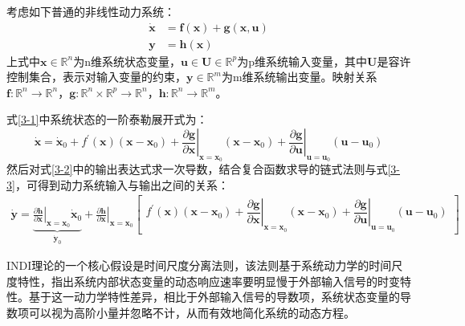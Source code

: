 考虑如下普通的非线性动力系统：
\begin{align}
    \dot{\boldsymbol{x}}&=\boldsymbol{f}(\boldsymbol{x})+\boldsymbol{g}(\boldsymbol{x},\boldsymbol{u}) \label{3-1}
    \\
    \boldsymbol{y}&=\boldsymbol{h}(\boldsymbol{x})\label{3-2}
\end{align}
上式中$\boldsymbol{x}\in\mathbb{R}^{n}$为n维系统状态变量，$\boldsymbol{u}\in\boldsymbol{U}\in\mathbb{R}^{p}$为p维系统输入变量，其中$\boldsymbol{U}$是容许控制集合，表示对输入变量的约束，$\boldsymbol{y}\in\mathbb{R}^{m}$为m维系统输出变量。映射关系$\boldsymbol{f}:\mathbb{R}^n\rightarrow\mathbb{R}^n$，$\boldsymbol{g}:\mathbb{R}^n\times\mathbb{R}^p\rightarrow\mathbb{R}^n$，$\boldsymbol{h}:\mathbb{R}^n\rightarrow\mathbb{R}^m$。

式\eqref{3-1}中系统状态的一阶泰勒展开式为：
\begin{equation}
    \dot{\boldsymbol{x}}=\dot{\boldsymbol{x}}_0+f^{\prime}(\boldsymbol{x})(\boldsymbol{x}-\boldsymbol{x}_0)+\left.\frac{\partial \boldsymbol{g}}{\partial \boldsymbol{x}}\right|_{\boldsymbol{x}=\boldsymbol{x}_0}(\boldsymbol{x}-\boldsymbol{x}_0)+\left.\frac{\partial \boldsymbol{g}}{\partial \boldsymbol{u}}\right|_{\boldsymbol{u}=\boldsymbol{u}_0}(\boldsymbol{u}-\boldsymbol{u}_0)
    \label{3-3}
\end{equation}
然后对式\eqref{3-2}中的输出表达式求一次导数，结合复合函数求导的链式法则与式\eqref{3-3}，可得到动力系统输入与输出之间的关系：
\begin{equation}
    \begin{aligned}
    \dot{\boldsymbol{y}} = \underbrace{\left.\frac{\partial\boldsymbol{h}}{\partial\boldsymbol{x}}\right|_{\boldsymbol{x}=\boldsymbol{x}_0}\dot{\boldsymbol{x}}_0}_{\dot{\boldsymbol{y}}_0} + \left.\frac{\partial \boldsymbol{h}}{\partial \boldsymbol{x}}\right|_{\boldsymbol{x}=\boldsymbol{x}_0}\begin{bmatrix}f^{\prime}(\boldsymbol{x})(\boldsymbol{x}-\boldsymbol{x}_0)+\left.\dfrac{\partial \boldsymbol{g}}{\partial \boldsymbol{x}}\right|_{\boldsymbol{x}=\boldsymbol{x}_0}(\boldsymbol{x}-\boldsymbol{x}_0)+\left.\dfrac{\partial \boldsymbol{g}}{\partial \boldsymbol{u}}\right|_{\boldsymbol{u}=\boldsymbol{u}_0}(\boldsymbol{u}-\boldsymbol{u}_0)\end{bmatrix}
    \end{aligned}
    \label{3-4}
\end{equation}

INDI理论的一个核心假设是时间尺度分离法则\cite{inproceedings}，该法则基于系统动力学的时间尺度特性，指出系统内部状态变量的动态响应速率要明显慢于外部输入信号的时变特性。基于这一动力学特性差异，相比于外部输入信号的导数项，系统状态变量的导数项可以视为高阶小量并忽略不计，从而有效地简化系统的动态方程。

